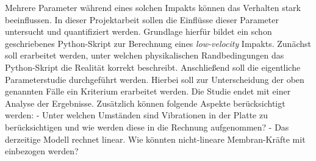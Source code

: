 Mehrere Parameter während eines solchen Impakts können das Verhalten stark beeinflussen. In dieser Projektarbeit sollen die Einflüsse dieser Parameter untersucht und quantifiziert werden. Grundlage hierfür bildet ein schon geschriebenes Python-Skript zur Berechnung eines \textit{low-velocity} Impakts. Zunächst soll erarbeitet werden, unter welchen physikalischen Randbedingungen das Python-Skript die Realität korrekt beschreibt. Anschließend soll die eigentliche Parameterstudie durchgeführt werden. Hierbei soll zur Unterscheidung der oben genannten Fälle ein Kriterium erarbeitet werden. Die Studie endet mit einer Analyse der Ergebnisse.
Zusätzlich können folgende Aspekte berücksichtigt werden: 
- Unter welchen Umständen sind Vibrationen in der Platte zu berücksichtigen und wie werden diese in die Rechnung aufgenommen?
- Das derzeitige Modell rechnet linear. Wie könnten nicht-lineare Membran-Kräfte mit einbezogen werden?

